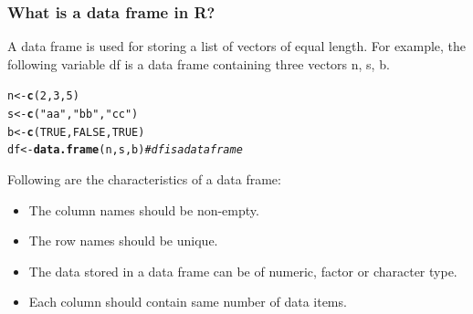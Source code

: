 \documentclass{beamer}\usepackage[]{graphicx}\usepackage[]{color}
\makeatletter
\newcommand{\hlnum}[1]{\textcolor[rgb]{0.686,0.059,0.569}{#1}}%
\newcommand{\hlstr}[1]{\textcolor[rgb]{0.192,0.494,0.8}{#1}}%
\newcommand{\hlcom}[1]{\textcolor[rgb]{0.678,0.584,0.686}{\textit{#1}}}%
\newcommand{\hlopt}[1]{\textcolor[rgb]{0,0,0}{#1}}%
\newcommand{\hlstd}[1]{\textcolor[rgb]{0.345,0.345,0.345}{#1}}%
\newcommand{\hlkwb}[1]{\textcolor[rgb]{0.69,0.353,0.396}{#1}}%
\newcommand{\hlkwd}[1]{\textcolor[rgb]{0.737,0.353,0.396}{\textbf{#1}}}%
\newenvironment{kframe}{%
 \def\at@end@of@kframe{}%
 \ifinner\ifhmode%
  \def\at@end@of@kframe{\end{minipage}}%
  \begin{minipage}{\columnwidth}%
 \fi\fi%
 \def\FrameCommand##1{\hskip\@totalleftmargin \hskip-\fboxsep
 \colorbox{shadecolor}{##1}\hskip-\fboxsep
     \hskip-\linewidth \hskip-\@totalleftmargin \hskip\columnwidth}%
 \MakeFramed {\advance\hsize-\width
   \@totalleftmargin\z@ \linewidth\hsize
   \@setminipage}}%
 {\par\unskip\endMakeFramed%
 \at@end@of@kframe}
\newenvironment{knitrout}{}{} %
\makeatother
\begin{document}
{{


\begin{frame}[fragile]
\frametitle{What is a data frame in R?}
A data frame is used for storing a list of vectors of equal length.
For example, the following variable df is a data frame containing three vectors n, s, b.
\begin{knitrout}\scriptsize
{}\color{fgcolor}\begin{kframe}
\begin{alltt}
\hlstd{n} \hlkwb{<-} \hlkwd{c}\hlstd{(}\hlnum{2}\hlstd{,} \hlnum{3}\hlstd{,} \hlnum{5}\hlstd{)}
\hlstd{s} \hlkwb{<-} \hlkwd{c}\hlstd{(}\hlstr{"aa"}\hlstd{,} \hlstr{"bb"}\hlstd{,} \hlstr{"cc"}\hlstd{)}
\hlstd{b} \hlkwb{<-} \hlkwd{c}\hlstd{(}\hlnum{TRUE}\hlstd{,} \hlnum{FALSE}\hlstd{,} \hlnum{TRUE}\hlstd{)}
\hlstd{df} \hlkwb{<-} \hlkwd{data.frame}\hlstd{(n, s, b)} \hlcom{# df is a data frame}
\end{alltt}
\end{kframe}
\end{knitrout}
Following are the characteristics of a data frame:
\begin{itemize}
\item The column names should be non-empty.
\item The row names should be unique.
\item The data stored in a data frame can be of numeric, factor or character type.
\item Each column should contain same number of data items.
\end{itemize}
\end{frame}


}}
\end{document}
